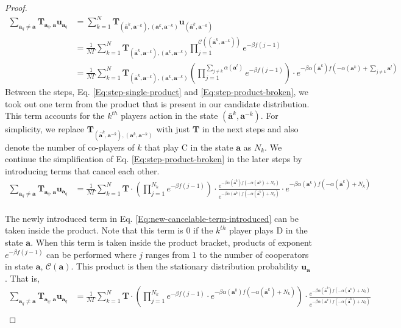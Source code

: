 \documentclass[11pt]{article}
\theoremstyle{plainCl1}
\theoremstyle{plainCl2}
\newcommand{\abf}{\mathbf{a}}
\newcommand{\T}{\mathbf{T}}
\newcommand{\ubf}{\mathbf{u}}
\newcommand{\C}{\mathrm{C}}
\newcommand{\D}{\mathrm{D}}
\begin{document}
\begin{proof}
\begin{align}
\sum_{\abf_q \neq \abf} \T_{\abf_q, \abf} \ubf_{\abf_q} &= \sum_{k=1}^N \T_{(\bar{\abf}^k, \abf^{-k}),(\abf^k, \abf^{-k})} \ubf_{(\bar{\abf}^k, \abf^{-k})} \\[10pt]
\label{Eq:step-single-product}
&= \frac{1}{N \Gamma} \sum_{k=1}^N \T_{(\bar{\abf}^k, \abf^{-k}),(\abf^k, \abf^{-k})} \displaystyle \prod_{j=1}^{\mathcal{C}((\bar{\abf}^k, \abf^{-k}))} e^{-\beta f(j-1)}\\[10pt]
&=  \frac{1}{N \Gamma} \sum_{k=1}^N \T_{(\bar{\abf}^k, \abf^{-k}),(\abf^k, \abf^{-k})} \displaystyle \left( \prod_{j=1}^{\sum_{j \neq k} \alpha(\abf^l)}  e^{-\beta f(j-1)} \right) \cdot e^{-\beta \alpha(\bar{\abf}^k)f(-\alpha(\abf^k)+ \sum_{j \neq k} \abf^l)}
\label{Eq:step-product-broken}
\end{align}
Between the steps, Eq. \ref{Eq:step-single-product} and \ref{Eq:step-product-broken}, we took out one term from the product that is present in our candidate distribution. This term accounts for the $k^{th}$ players action in the state $(\bar{\abf}^k, \abf^{-k})$. For simplicity, we replace $\T_{(\bar{\abf}^k, \abf^{-k}),(\abf^k, \abf^{-k})}$ with just $\T$ in the next steps and also denote the number of co-players of $k$ that play $\C$ in the state $\abf$ as $N_k$. 
\noindent We continue the simplification of Eq. \ref{Eq:step-product-broken} in the later steps by introducing terms that cancel each other. \\[10pt]
\begin{align}
\sum_{\abf_q \neq \abf} \T_{\abf_q, \abf} \ubf_{\abf_q} &=  \frac{1}{N \Gamma} \sum_{k=1}^N \T \cdot \displaystyle \left( \prod_{j=1}^{N_k}  e^{-\beta f(j-1)} \right) \cdot \frac{e^{-\beta \alpha(\bar{\abf}^k)f(-\alpha(\abf^k)+ N_k)}}{e^{-\beta \alpha(\abf^k)f(-\alpha(\bar{\abf}^k) +N_k)}} \cdot e^{-\beta \alpha(\abf^k)f(-\alpha(\bar{\abf}^k) + N_k)}
\label{Eq:new-cancelable-term-introduced}
\end{align}
\\ \noindent The newly introduced term in Eq. \ref{Eq:new-cancelable-term-introduced} can be taken inside the product. Note that this term is 0 if the $k^{th}$ player plays $\D$ in the state $\abf$. When this term is taken inside the product bracket, products of exponent $e^{-\beta f(j-1)}$ can be performed where $j$ ranges from $1$ to the number of cooperators in state $\abf$, $\mathcal{C}(\abf)$. This product is then the stationary distribution probability $\ubf_\abf$. That is, 
\begin{align}
\sum_{\abf_q \neq \abf} \T_{\abf_q, \abf} \ubf_{\abf_q} &=  \frac{1}{N \Gamma} \sum_{k=1}^N \T \cdot \displaystyle \left( \prod_{j=1}^{N_k}  e^{-\beta f(j-1)} \cdot e^{-\beta \alpha(\abf^k)f(-\alpha(\bar{\abf}^k) + N_k)} \right) \cdot \frac{e^{-\beta \alpha(\bar{\abf}^k)f(-\alpha(\abf^k)+ N_k)}}{e^{-\beta \alpha(\abf^k)f(-\alpha(\bar{\abf}^k) +N_k)}} \\[10pt]

\end{align}
\end{proof}
\end{document}
